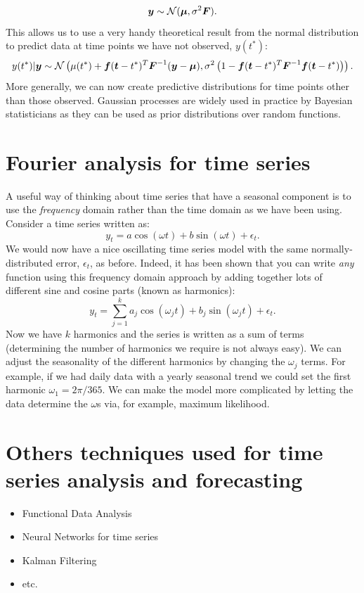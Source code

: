 \documentclass[a4paper,11pt,oneside,onecolumn]{book}
\newcommand{\bmat}[1]{\mbox{\boldmath $ #1 $}}
\begin{document}
\[ \bmat{y} \sim \mathcal{N}(\bmat{\mu},\sigma^2 \bmat{F}). \]
This allows us to use a very handy theoretical result from the normal distribution to predict data at time points we have not observed, $y(t^*)$:
\[ y(t^*)|\bmat{y} \sim \mathcal{N}\left( \mu(t^*)+ \bmat{f}(\bmat{t}-t^*)^T \bmat{F}^{-1} (\bmat{y}-\bmat{\mu}), \sigma^2 \left( 1 - \bmat{f}(\bmat{t}-t^*)^T \bmat{F}^{-1} \bmat{f}(\bmat{t}-t^*) \right) \right). \]
More generally, we can now create predictive distributions for time points other than those observed. Gaussian processes are widely used in practice by Bayesian statisticians as they can be used as prior distributions over random functions.

\section{Fourier analysis for time series}
\label{sec:FT}

A useful way of thinking about time series that have a seasonal component is to use the \textit{frequency} domain rather than the time domain as we have been using. Consider a time series written as:
\[ y_t = a \cos (\omega t) + b \sin( \omega t) + \epsilon_t. \]
We would now have a nice oscillating time series model with the same normally-distributed error, $\epsilon_t$, as before. Indeed, it has been shown that you can write \textit{any} function using this frequency domain approach by adding together lots of different sine and cosine parts (known as harmonics):
\[ y_t = \sum_{j=1}^k a_j \cos( \omega_j t )+ b_j \sin (\omega_j t )+ \epsilon_t. \]
Now we have $k$ harmonics and the series is written as a sum of terms (determining the number of harmonics we require is not always easy). We can adjust the seasonality of the different harmonics by changing the $\omega_j$ terms. For example, if we had daily data with a yearly seasonal trend we could set the first harmonic $\omega_1 = 2 \pi / 365$. We can make the model more complicated by letting the data determine the $\omega$s via, for example, maximum likelihood.



\section{Others techniques used for time series analysis and forecasting}
\begin{itemize}
\item Functional Data Analysis 
\item Neural Networks for time series
\item Kalman Filtering
\item etc.
\end{itemize}


\nocite{}



\label{mylastpage}
\end{document}
